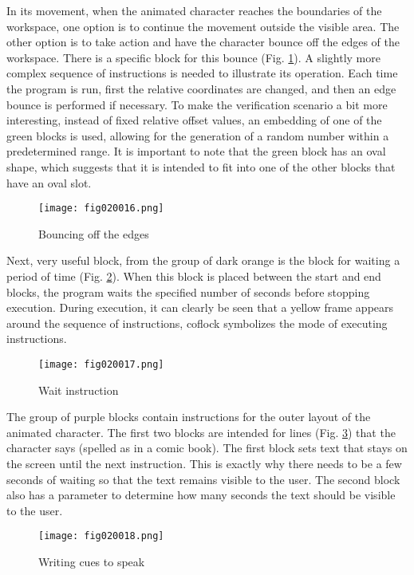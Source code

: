 In its movement, when the animated character reaches the boundaries of the workspace, one option is to continue the movement outside the visible area. The other option is to take action and have the character bounce off the edges of the workspace. There is a specific block for this bounce (Fig. \ref{fig020016}). A slightly more complex sequence of instructions is needed to illustrate its operation. Each time the program is run, first the relative coordinates are changed, and then an edge bounce is performed if necessary. To make the verification scenario a bit more interesting, instead of fixed relative offset values, an embedding of one of the green blocks is used, allowing for the generation of a random number within a predetermined range. It is important to note that the green block has an oval shape, which suggests that it is intended to fit into one of the other blocks that have an oval slot.

\begin{figure}[H]
   \centering
   \texttt{[image: fig020016.png]}
   \caption{Bouncing off the edges}
\label{fig020016}
\end{figure}

Next, very useful block, from the group of dark orange is the block for waiting a period of time (Fig. \ref{fig020017}). When this block is placed between the start and end blocks, the program waits the specified number of seconds before stopping execution. During execution, it can clearly be seen that a yellow frame appears around the sequence of instructions, coflock symbolizes the mode of executing instructions.

\begin{figure}[H]
   \centering
   \texttt{[image: fig020017.png]}
   \caption{Wait instruction}
\label{fig020017}
\end{figure}

The group of purple blocks contain instructions for the outer layout of the animated character. The first two blocks are intended for lines (Fig. \ref{fig020018}) that the character says (spelled as in a comic book). The first block sets text that stays on the screen until the next instruction. This is exactly why there needs to be a few seconds of waiting so that the text remains visible to the user. The second block also has a parameter to determine how many seconds the text should be visible to the user.

\begin{figure}[H]
   \centering
   \texttt{[image: fig020018.png]}
   \caption{Writing cues to speak}
\label{fig020018}
\end{figure}

